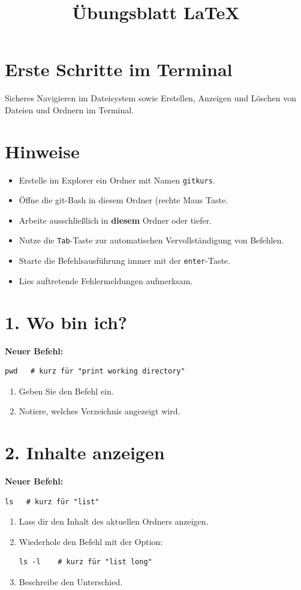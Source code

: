 \documentclass[]{scrreprt}
\title{Übungsblatt \LaTeX}
\author{}
\date{}
\begin{document}
\section*{Erste Schritte im Terminal}
Sicheres Navigieren im Dateisystem sowie Erstellen, Anzeigen und Löschen von
Dateien und Ordnern im Terminal.

\section*{Hinweise}
\begin{itemize}
  \item Erstelle im Explorer ein Ordner mit Namen \texttt{gitkurs}.
  \item Öffne die git-Bash in diesem Ordner (rechte Maus Taste.
  \item Arbeite ausschließlich in \textbf{diesem} Ordner oder tiefer.
  \item Nutze die \texttt{Tab}-Taste zur automatischen Vervollständigung von Befehlen.
  \item Starte die Befehlsausführung immer mit der \texttt{enter}-Taste.
  \item Lies auftretende Fehlermeldungen aufmerksam.
\end{itemize}

\section*{1. Wo bin ich?}

\textbf{Neuer Befehl:}
\begin{lstlisting}
pwd   # kurz für "print working directory"
\end{lstlisting}

\begin{enumerate}
  \item Geben Sie den Befehl ein.
  \item Notiere, welches Verzeichnis angezeigt wird.
\end{enumerate}

\section*{2. Inhalte anzeigen}

\textbf{Neuer Befehl:}
\begin{lstlisting}
ls   # kurz für "list"
\end{lstlisting}

\begin{enumerate}
  \item Lass dir den Inhalt des aktuellen Ordners anzeigen.
  \item Wiederhole den Befehl mit der Option:
\begin{lstlisting}
ls -l    # kurz für "list long"
\end{lstlisting}
  \item Beschreibe den Unterschied.
\end{enumerate}
\end{document}
